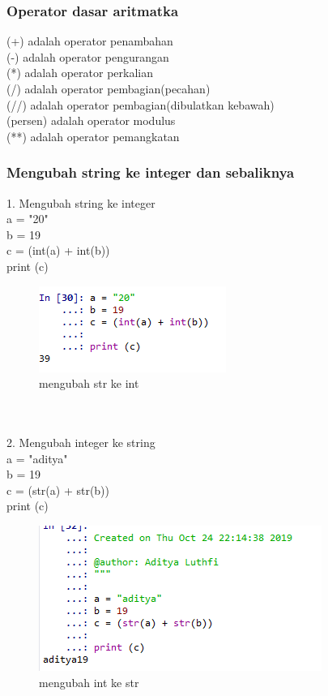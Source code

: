 \documentclass[12pt, times new roman, a4paper]{article}
\begin{document}
\subsubsection{Operator dasar aritmatka}
(+) adalah operator penambahan\\
(-) adalah operator pengurangan\\
(*) adalah operator perkalian\\
(/) adalah operator pembagian(pecahan)\\
(//) adalah operator pembagian(dibulatkan kebawah)\\
(persen) adalah operator modulus\\
(**) adalah operator pemangkatan\\
\subsubsection{Mengubah string ke integer dan sebaliknya}
1. Mengubah string ke integer\\
a = "20"\\
b = 19\\
c = (int(a) + int(b))\\
print (c)\\
\begin{figure}[h]
	\centering
		\includegraphics[scale=1.2]{Gambar/1}
	\caption{mengubah str ke int}
\end{figure}
\\
\\
2. Mengubah integer ke string\\
a = "aditya"\\
b = 19\\
c = (str(a) + str(b))\\
print (c)\\
\begin{figure}[h]
	\centering
		\includegraphics[scale=1]{Gambar/2}
	\caption{mengubah int ke str}
\end{figure}
\end{document}
